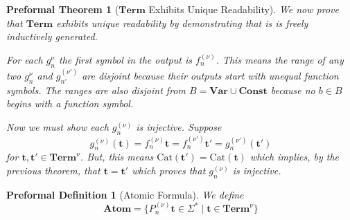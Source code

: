 \documentclass[oneside, 12pt]{book}
\theoremstyle{break}
\newtheorem{preformal definition}[definition]{Preformal Definition}
\newtheorem{preformal theorem}[theorem]{Preformal Theorem}
\newcommand{\bv}[1]{\boldsymbol{#1}}
\begin{document}
		\begin{preformal theorem}[$\textbf{Term}$ Exhibits Unique Readability]
			We now prove that $\textbf{Term}$ exhibits unique readability by demonstrating that is is freely inductively generated.
			
			For each $g_n^{\nu}$ the first symbol in the output is $f_n^{(\nu)}$.
			This means the range of any two $g_n^{\nu}$ and $g_{n'}^{(\nu')}$ are disjoint because their outputs start with unequal function symbols.
			The ranges are also disjoint from $B = \textbf{Var} \cup \textbf{Const}$ because no $b\in B$ begins with a function symbol.
			
			Now we must show each $g_n^{(\nu)}$ is injective.
			Suppose
			\begin{equation*}
				g_n^{(\nu)}(\bv{t}) = f_n^{(\nu)}\bv{t} = f_n^{(\nu')} \bv{t}'= g_n^{(\nu')}(\bv{t}')
			\end{equation*}
			for $\bv{t}, \bv{t}' \in \textbf{Term}^{\nu}$.
			But, this means $\text{Cat}(\bv{t}') = \text{Cat}(\bv{t})$ which implies, by the previous theorem, that $\bv{t} = \bv{t}'$ which proves that $g_n^{(\nu)}$ is injective.
		\end{preformal theorem}
	
		\begin{preformal definition}[Atomic Formula]
			We define
			\begin{equation*}
				\textbf{Atom} = \{ P_n^{(\nu)} \bv{t} \in \Sigma^* \mid \bv{t} \in \textbf{Term}^{\nu} \}
			\end{equation*}
		\end{preformal definition}
		
\end{document}
